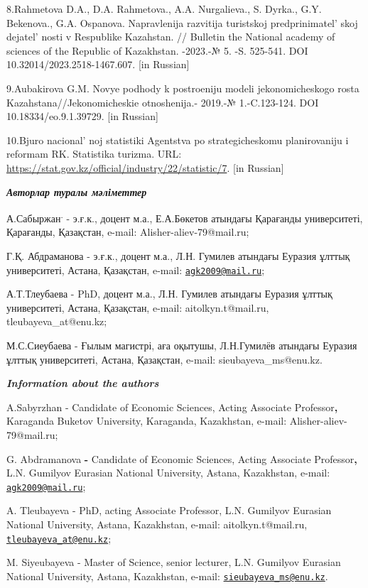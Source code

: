 8.Rahmetova D.A., D.A. Rahmetova., A.A. Nurgalieva., S. Dyrka., G.Y.
Bekenova., G.A. Ospanova. Napravlenija razvitija turistskoj
predprinimatel' skoj dejatel' nosti v
Respublike Kazahstan. // Bulletin the National academy of sciences of
the Republic of Kazakhstan. -2023.-№ 5. -S. 525-541. DOI
10.32014/2023.2518-1467.607. {[}in Russian{]}

9.Aubakirova G.M. Novye podhody k postroeniju modeli jekonomicheskogo
rosta Kazahstana//Jekonomicheskie otnoshenija.- 2019.-№ 1.-C.123-124.
DOI 10.18334/eo.9.1.39729. {[}in Russian{]}

10.Bjuro nacional' noj statistiki Agentstva po
strategicheskomu planirovaniju i reformam RK. Statistika turizma. URL:
\url{https://stat.gov.kz/official/industry/22/statistic/7}. {[}in
Russian{]}

\emph{{\bfseries Авторлар туралы мәліметтер}}

А.Сабыржан\textsuperscript{.} - э.ғ.к., доцент м.а., Е.А.Бөкетов
атындағы Қарағанды университеті, Қарағанды, Қазақстан, e-mail:
Alisher-aliev-79@mail.ru;

Г.Қ. Абдраманова - э.ғ.к., доцент м.а., Л.Н. Гумилев атындағы Еуразия
ұлттық университеті, Астана, Қазақстан, e-mail:
\href{mailto:agk2009@mail.ru}{\nolinkurl{agk2009@mail.ru}};

А.Т.Тлеубаева - PhD, доцент м.а., Л.Н. Гумилев атындағы Еуразия ұлттық
университеті, Астана, Қазақстан, e-mail: aitolkyn.t@mail.ru,
tleubayeva\_at@enu.kz;

М.С.Сиеубаева - Ғылым магистрі, аға оқытушы, Л.Н.Гумилёв атындағы
Еуразия ұлттық университеті, Астана, Қазақстан, e-mail:
sieubayeva\_ms@enu.kz.

\emph{{\bfseries Information about the authors}}

A.Sabyrzhan - Candidate of Economic Sciences, Acting Associate
Professor{\bfseries ,} Karaganda Buketov University, Karaganda, Kazakhstan,
e-mail: Alisher-aliev-79@mail.ru;

G. Abdramanova {\bfseries -} Candidate of Economic Sciences, Acting
Associate Professor{\bfseries ,} L.N. Gumilyov Eurasian National
University, Astana, Kazakhstan, e-mail:
\href{mailto:agk2009@mail.ru}{\nolinkurl{agk2009@mail.ru}};

A. Tleubayeva - PhD, acting Associate Professor, L.N. Gumilyov Eurasian
National University, Astana, Kazakhstan, e-mail: aitolkyn.t@mail.ru,
\href{mailto:tleubayeva_at@enu.kz}{\nolinkurl{tleubayeva\_at@enu.kz}};

M. Siyeubayeva - Master of Science, senior lecturer, L.N. Gumilyov
Eurasian National University, Astana, Kazakhstan, e-mail:
\href{mailto:sieubayeva_ms@enu.kz}{\nolinkurl{sieubayeva\_ms@enu.kz}}.